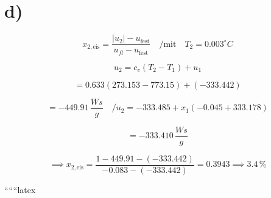 

\section*{d)}

\[
x_{2, \text{eis}} = \frac{|u_2| - u_{\text{fest}}}{u_{fl} - u_{\text{fest}}} \quad / \text{mit} \quad T_2 = 0.003^\circ C
\]

\[
u_2 = c_v (T_2 - T_1) + u_1
\]

\[
= 0.633 \left(273.153 - 773.15\right) + (-333.442)
\]

\[
= -449.91 \, \frac{Ws}{g} \quad / u_2 = -333.485 + x_1 (-0.045 + 333.178)
\]

\[
= -333.410 \, \frac{Ws}{g}
\]

\[
\implies x_{2, \text{eis}} = \frac{1 - 449.91 - (-333.442)}{-0.083 - (-333.442)} = 0.3943 \implies 3.4 \, \% 
\]

``````latex
